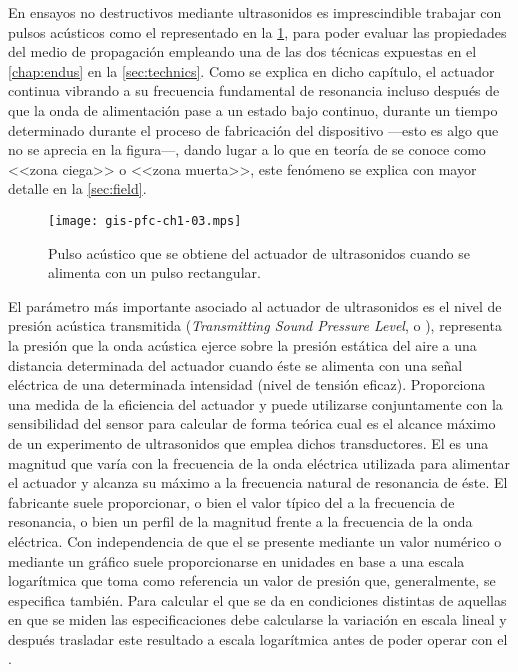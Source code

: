 En ensayos no destructivos mediante ultrasonidos es imprescindible trabajar
con pulsos acústicos como el representado en la \cref{fig:pulse}, para
poder evaluar las propiedades del medio de propagación empleando una de las
dos técnicas expuestas en el \cref{chap:endus} en la \cref{sec:technics}.
Como se explica en dicho capítulo, el actuador continua vibrando a su
frecuencia fundamental de resonancia incluso después de que la onda de
alimentación pase a un estado bajo continuo, durante un tiempo determinado
durante el proceso de fabricación del dispositivo ---esto es algo que no se
aprecia en la figura---, dando lugar a lo que en teoría de  se
conoce como <<zona ciega>> o <<zona muerta>>, este fenómeno se explica con
mayor detalle en la \cref{sec:field}.

\begin{figure}
	\begin{center}
		\texttt{[image: gis-pfc-ch1-03.mps]}
	\end{center}
	\caption[Pulso acústico generado por el actuador de
	ultrasonidos]{Pulso acústico que se obtiene del actuador de
	ultrasonidos cuando se alimenta con un pulso rectangular.}
	\label{fig:pulse}
\end{figure}

El parámetro más importante asociado al actuador de ultrasonidos es el
nivel de presión acústica transmitida (\emph{Transmitting Sound Pressure
Level}, o ), representa la presión que la onda acústica ejerce
sobre la presión estática del aire a una distancia determinada del actuador
cuando éste se alimenta con una señal eléctrica de una determinada
intensidad (nivel de tensión eficaz). Proporciona una medida de la
eficiencia del actuador y puede utilizarse conjuntamente con la
sensibilidad del sensor para calcular de forma teórica cual es el alcance
máximo de un experimento de ultrasonidos que emplea dichos transductores.
El  es una magnitud que varía con la frecuencia de la onda
eléctrica utilizada para alimentar el actuador y alcanza su máximo a la
frecuencia natural de resonancia de éste. El fabricante suele proporcionar,
o bien el valor típico del  a la frecuencia de resonancia, o bien
un perfil de la magnitud frente a la frecuencia de la onda eléctrica. Con
independencia de que el  se presente mediante un valor numérico o
mediante un gráfico suele proporcionarse en unidades en base a una escala
logarítmica que toma como referencia un valor de presión que, generalmente,
se especifica también. Para calcular el  que se da en condiciones
distintas de aquellas en que se miden las especificaciones debe calcularse
la variación en escala lineal y después trasladar este resultado a escala
logarítmica antes de poder operar con el .


